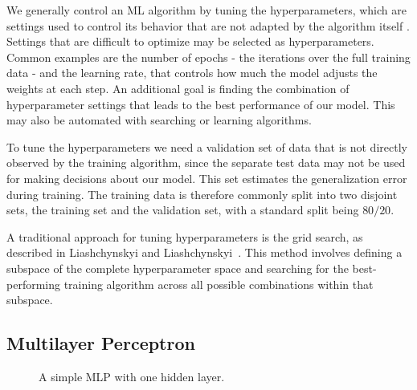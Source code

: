 We generally control an ML algorithm by tuning the hyperparameters, which are settings used to control its behavior that are not adapted by the algorithm itself \cite{Goodfellow-et-al-2016}. Settings that are difficult to optimize may be selected as hyperparameters. Common examples are the number of epochs - the iterations over the full training data - and the learning rate, that controls how much the model adjusts the weights at each step. An additional goal is finding the combination of hyperparameter settings that leads to the best performance of our model. This may also be automated with searching or learning algorithms.

To tune the hyperparameters we need a validation set of data that is not directly observed by the training algorithm, since the separate test data may not be used for making decisions about our model. This set estimates the generalization error during training. The training data is therefore commonly split into two disjoint sets, the training set and the validation set, with a standard split being $80/20$.

A traditional approach for tuning hyperparameters is the grid search, as described in Liashchynskyi and Liashchynskyi~\cite{liashchynskyi2019grid}. This method involves defining a subspace of the complete hyperparameter space and searching for the best-performing training algorithm across all possible combinations within that subspace.

\subsection{Multilayer Perceptron}

\begin{figure}
    \centering
    \caption{A simple MLP with one hidden layer.}
    \label{fig:2layer_mlp}
  \end{figure}

